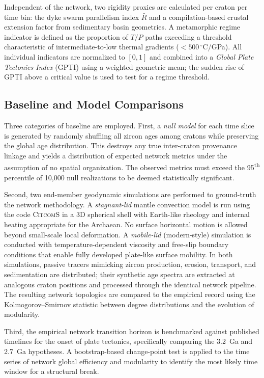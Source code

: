 \documentclass{article}
\begin{document}
Independent of the network, two rigidity proxies are calculated per craton per time bin: the dyke swarm parallelism index $\bar{R}$ and a compilation-based crustal extension factor from sedimentary basin geometries. A metamorphic regime indicator is defined as the proportion of $T/P$ paths exceeding a threshold characteristic of intermediate-to-low thermal gradients ($< 500\,^\circ$C/GPa). All individual indicators are normalized to $[0,1]$ and combined into a \emph{Global Plate Tectonics Index} (GPTI) using a weighted geometric mean; the sudden rise of GPTI above a critical value is used to test for a regime threshold.

\subsection{Baseline and Model Comparisons}
Three categories of baseline are employed. First, a \emph{null model} for each time slice is generated by randomly shuffling all zircon ages among cratons while preserving the global age distribution. This destroys any true inter-craton provenance linkage and yields a distribution of expected network metrics under the assumption of no spatial organization. The observed metrics must exceed the 95\textsuperscript{th} percentile of 10,000 null realizations to be deemed statistically significant.

Second, two end-member geodynamic simulations are performed to ground-truth the network methodology. A \emph{stagnant-lid} mantle convection model is run using the code \textsc{CitcomS} in a 3D spherical shell with Earth-like rheology and internal heating appropriate for the Archaean. No surface horizontal motion is allowed beyond small-scale local deformation. A \emph{mobile-lid} (modern-style) simulation is conducted with temperature-dependent viscosity and free-slip boundary conditions that enable fully developed plate-like surface mobility. In both simulations, passive tracers mimicking zircon production, erosion, transport, and sedimentation are distributed; their synthetic age spectra are extracted at analogous craton positions and processed through the identical network pipeline. The resulting network topologies are compared to the empirical record using the Kolmogorov–Smirnov statistic between degree distributions and the evolution of modularity.

Third, the empirical network transition horizon is benchmarked against published timelines for the onset of plate tectonics, specifically comparing the 3.2~Ga and 2.7~Ga hypotheses. A bootstrap-based change-point test is applied to the time series of network global efficiency and modularity to identify the most likely time window for a structural break.
\end{document}
